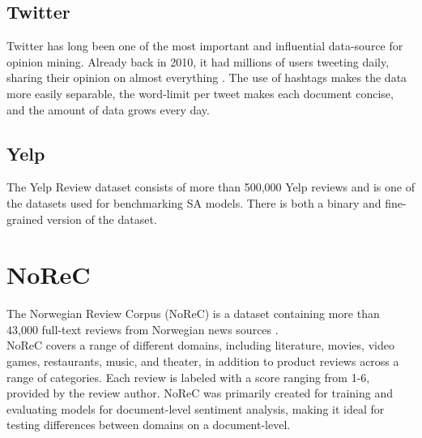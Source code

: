 \subsection{Twitter}
Twitter has long been one of the most important and influential data-source for opinion mining. Already back in 2010, it had millions of users tweeting daily, sharing their opinion on almost everything \cite{pak-paroubek-2010-twitter}. The use of hashtags makes the data more easily separable, the word-limit per tweet makes each document concise, and the amount of data grows every day.
\subsection{Yelp} 
The Yelp Review dataset \cite{zhang2016characterlevel} consists of more than 500,000 Yelp reviews and is one of the datasets used for benchmarking SA models. There is both a binary and fine-grained version of the dataset.


\section{NoReC} \label{NoReC}
The Norwegian Review Corpus (NoReC) is a dataset containing more than 43,000 full-text reviews from Norwegian news sources \cite{VelOvrBer18}.\\
NoReC covers a range of different domains, including literature, movies, video games, restaurants, music, and theater, in addition to product reviews across a range of categories. Each review is labeled with a score ranging from 1-6, provided by the review author. NoReC was primarily created for training and evaluating models for document-level sentiment analysis, making it ideal for testing differences between domains on a document-level.\\
